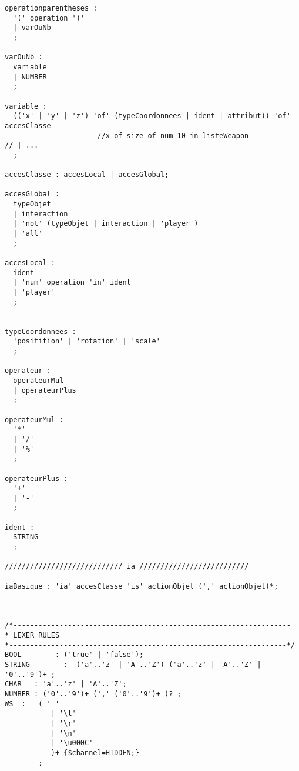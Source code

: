 \begin{lstlisting}[language=GameGrammar]
operationparentheses :
  '(' operation ')'
  | varOuNb
  ;
 
varOuNb :
  variable
  | NUMBER
  ;
 
variable :
  (('x' | 'y' | 'z') 'of' (typeCoordonnees | ident | attribut)) 'of' accesClasse
                      //x of size of num 10 in listeWeapon
// | ...
  ;
 
accesClasse : accesLocal | accesGlobal;
 
accesGlobal :
  typeObjet
  | interaction
  | 'not' (typeObjet | interaction | 'player')
  | 'all'
  ;
 
accesLocal :
  ident
  | 'num' operation 'in' ident
  | 'player'
  ;
 
 
typeCoordonnees :
  'positition' | 'rotation' | 'scale'
  ;
 
operateur :
  operateurMul
  | operateurPlus
  ;
  
operateurMul :
  '*'
  | '/'
  | '%'
  ;
  
operateurPlus :
  '+'
  | '-'
  ;
 
ident :
  STRING
  ;
 
//////////////////////////// ia //////////////////////////
 
iaBasique : 'ia' accesClasse 'is' actionObjet (',' actionObjet)*;
 
 
 
/*------------------------------------------------------------------
* LEXER RULES
*------------------------------------------------------------------*/
BOOL        : ('true' | 'false');
STRING        :  ('a'..'z' | 'A'..'Z') ('a'..'z' | 'A'..'Z' | '0'..'9')+ ;
CHAR   : 'a'..'z' | 'A'..'Z';
NUMBER : ('0'..'9')+ (',' ('0'..'9')+ )? ;
WS  :   ( ' '  
           | '\t'  
           | '\r'  
           | '\n'  
           | '\u000C'
           )+ {$channel=HIDDEN;}  
        ;
\end{lstlisting}
